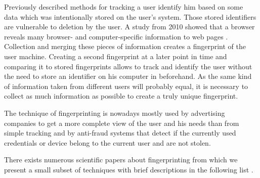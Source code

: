 	Previously described methods for tracking a user identify him based on some data which was intentionally stored on the user's system. Those stored identifiers are vulnerable to deletion by the user. A study from 2010 showed that a browser reveals many browser- and computer-specific information to web pages \cite{Eckersley:2010:UYW:1881151.1881152}. Collection and merging these pieces of information creates a fingerprint of the user machine. Creating a second fingerprint at a later point in time and comparing it to stored fingerprints allows to track and identify the user without the need to store an identifier on his computer in beforehand. As the same kind of information taken from different users will probably equal, it is necessary to collect as much information as possible to create a truly unique fingerprint. 
	
	The technique of fingerprinting is nowadays mostly used by advertising companies to get a more complete view of the user and his needs than from simple tracking and by anti-fraud systems that detect if the currently used credentials or device belong to the current user and are not stolen.

	There exists numerous scientific papers about fingerprinting from which we present a small subset of techniques with brief descriptions in the following list \cite{paulstone_historysniffing, MBYS11, Nikiforakis:2013:CME:2497621.2498133, Eckersley:2010:UYW:1881151.1881152, MS12, olejnik:hal-00747841}. 
	
